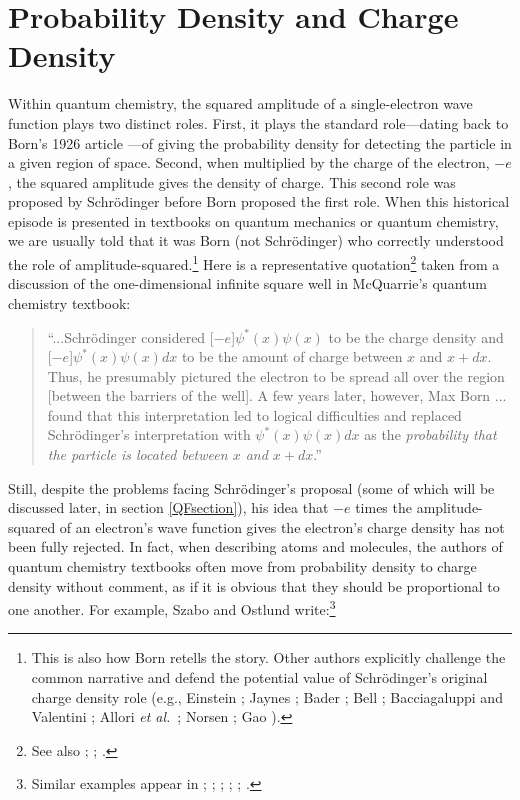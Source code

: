 \documentclass[12pt,onecolumn,secnumarabic,amsmath,amssymb,balancelastpage,nofootinbib]{article}
\begin{document}
\section{Probability Density and Charge Density}\label{PCsection}

Within quantum chemistry, the squared amplitude of a single-electron wave function plays two distinct roles.  First, it plays the standard role---dating back to Born's 1926 article \cite{born1926}---of giving the probability density for detecting the particle in a given region of space.  Second, when multiplied by the charge of the electron, $-e$, the squared amplitude gives the density of charge.  This second role was proposed by Schr\"{o}dinger \cite{schrodinger1926pt3, schrodinger1926pt4, schrodinger1926rev, schrodinger1928report, schrodingerletter} before Born proposed the first role.  When this historical episode is presented in textbooks on quantum mechanics or quantum chemistry, we are usually told that it was Born (not Schr\"{o}dinger) who correctly understood the role of amplitude-squared.\footnote{This is also how Born \cite{born1955} retells the story.  Other authors explicitly challenge the common narrative and defend the potential value of Schr\"{o}dinger's original charge density role (e.g., Einstein \cite[pg.\ 168--169]{einstein1934}; Jaynes \cite{jaynes1973}; Bader \cite{bader1990, bader2003, bader2010}; Bell \cite[pg.\ 39--40]{bell1990}; Bacciagaluppi and Valentini \cite[ch.\ 4]{bacciagaluppi2009}; Allori \emph{et al.}\ \cite{allori2011}; Norsen \cite[ch.\ 5]{norsen2017}; Gao \cite{gao2017, gao2018}).}  Here is a representative quotation\footnote{See also \cite[sec.\ 3.6]{gillespie2001}; \cite[ch.\ 17]{longair2013}; \cite[pg.\ 10, 147, 460]{levineQC}.} taken from a discussion of the one-dimensional infinite square well in McQuarrie's quantum chemistry textbook:
\begin{quote}
``...Schr\"{o}dinger considered [$-e$]$\psi^*(x)\psi(x)$ to be the charge density and [$-e$]$\psi^*(x)\psi(x)dx$ to be the amount of charge between $x$ and $x+dx$.  Thus, he presumably pictured the electron to be spread all over the region [between the barriers of the well].  A few years later, however, Max Born ... found that this interpretation led to logical difficulties and replaced Schr\"{o}dinger's interpretation with $\psi^*(x)\psi(x)dx$ as the \emph{probability that the particle is located between $x$ and $x+dx$}.'' \cite[pg.\ 104]{mcquarrieQC}
\end{quote}
Still, despite the problems facing Schr\"{o}dinger's proposal (some of which will be discussed later, in section \ref{QFsection}), his idea that $-e$ times the amplitude-squared of an electron's wave function gives the electron's charge density has not been fully rejected.  In fact, when describing atoms and molecules, the authors of quantum chemistry textbooks often move from probability density to charge density without comment, as if it is obvious that they should be proportional to one another.  For example, Szabo and Ostlund write:\footnote{Similar examples appear in \cite[pg.\ 151]{szaboQC}; \cite[pg.\ 6]{bader1990}; \cite[pg.\ 771]{shusterman1997}; \cite[pg.\ 1141]{matta2002}; \cite[pg.\ 223]{atkins2011}; \cite[pg.\ 403, 460]{levineQC}.}
\end{document}
